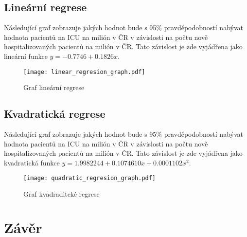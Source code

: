 \documentclass[a4paper, 12pt]{article}
\begin{document}
\subsection{Lineární regrese}

Následující graf zobrazuje jakých hodnot bude s 95\% pravděpodobností nabývat
hodnota pacientů na ICU na milión v ČR v závislosti na počtu nově hospitalizovaných
pacientů na milión v ČR. Tato závislost je zde vyjádřena jako lineární funkce $y = -0.7746 + 0.1826x$.

\begin{figure}[H]
\centering
\texttt{[image: linear\_regresion\_graph.pdf]}
\caption{Graf lineární regrese}

\end{figure}

\clearpage

\subsection{Kvadratická regrese}

Následující graf zobrazuje jakých hodnot bude s 95\% pravděpodobností nabývat
hodnota pacientů na ICU na milión v ČR v závislosti na počtu nově hospitalizovaných
pacientů na milión v ČR. Tato závislost je zde vyjádřena jako kvadratická funkce $y = 1.9982244 + 0.1074610x + 0.0001102x^2$.

\begin{figure}[H]
\centering
\texttt{[image: quadratic\_regresion\_graph.pdf]}
\caption{Graf kvadraditcké regrese}

\end{figure}

\clearpage


\clearpage {} {}
\section*{Závěr}
\end{document}
